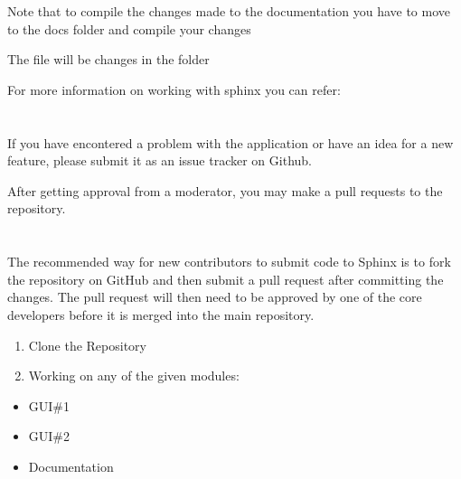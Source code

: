 \documentclass[letterpaper,10pt,english]{sphinxmanual}
\begin{document}
Note that to compile the changes made to the documentation you have to move to the docs folder and compile your changes

\begin{sphinxVerbatim}[commandchars=\\\{\}]
 
 
\end{sphinxVerbatim}

The file will be changes in the  folder

For more information on working with sphinx you can refer:


\section{}
\label{\detokenize{developer:bug-reports-and-feature-requests}}
If you have encontered a problem with the application or have an idea for a new feature, please submit it as an issue tracker on Github.

After getting approval from a moderator, you may make a pull requests to the repository.


\section{}
\label{\detokenize{developer:contributing-on-the-project}}
The recommended way for new contributors to submit code to Sphinx is to fork the repository on GitHub and then submit a pull request after committing the changes. The pull request will then need to be approved by one of the core developers before it is merged into the main repository.
\begin{enumerate}
%
\item {} 
Clone the Repository

\item {} 
Working on any of the given modules:

\end{enumerate}
\begin{itemize}
\item {} 
GUI\#1

\item {} 
GUI\#2

\item {} 
Documentation

\end{itemize}
\end{document}

